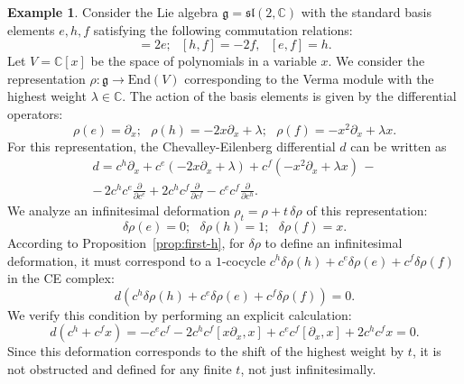 \documentclass[10pt,a4paper]{amsart}
\theoremstyle{definition}
\newtheorem{example}[remark]{Example}
\begin{document}
\begin{example}
    Consider the Lie algebra $\mathfrak{g}=\mathfrak{sl}(2,\mathbb{C})$ with the standard basis elements $e,h,f$ satisfying the following commutation relations:
    \begin{equation}
        [h,e]=2e;\ \ \ [h,f]=-2f,\ \ \ [e,f]=h.
    \end{equation}
    Let $V=\mathbb{C}[x]$ be the space of polynomials in a variable $x$. We consider the representation $\rho:\mathfrak{g}\rightarrow \mathrm{End}(V)$ corresponding to the Verma module with the highest weight $
    \lambda \in \mathbb{C}$. The action of the basis elements is given by the differential operators:
    \begin{equation}
            \rho(e)=\partial_x;\ \ \ 
            \rho(h)=-2x\partial_x+\lambda;\ \ \ 
            \rho(f)=-x^2\partial_x+\lambda x.
    \end{equation}
    For this representation, the Chevalley-Eilenberg differential $d$ can be written as
    \begin{equation}
        \begin{aligned}
            d=c^h\partial_x+c^e(-2x\partial_x+\lambda)+c^f(-x^2\partial_x+\lambda x)\,-\\
            -\,2c^h c^e \frac{\partial}{\partial c^e}+2 c^h c^f \frac{\partial}{\partial c^f}-c^e c^f \frac{\partial}{\partial c^h}.
        \end{aligned}
    \end{equation}
    We analyze an infinitesimal deformation $\rho_t=\rho+t\,\delta\rho$ of this representation:
    \begin{equation}
            \delta\rho(e)=0;\ \ \ \delta\rho(h)=1;\ \ \ \delta\rho(f)=x.
    \end{equation}
    According to Proposition~\ref{prop:first-h}, for $\delta\rho$ to define an infinitesimal deformation, it must correspond to a $1$-cocycle $c^h\delta\rho(h)+c^e\delta\rho(e)+c^f\delta\rho(f)$ in the CE complex:
    \begin{equation}
        d(c^h\delta\rho(h)+c^e\delta\rho(e)+c^f\delta\rho(f))=0.
    \end{equation}
    We verify this condition by performing an explicit calculation:
    \begin{equation}
        d(c^h+c^f x)=-c^e c^f-2c^h c^f[x\partial_x,x]+c^ec^f[\partial_x,x]+2c^hc^fx=0.
    \end{equation}
    Since this deformation corresponds to the shift of the highest weight by $t$, it is not obstructed and defined for any finite $t$, not just infinitesimally.
\end{example}
\end{document}
